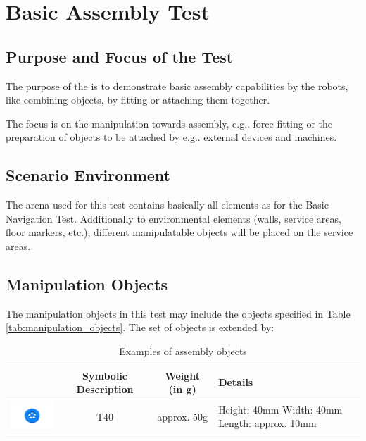 \newpage
\section{Basic Assembly Test}

\subsection{Purpose and Focus of the Test}
The purpose of the  is to demonstrate basic assembly capabilities by the robots, like combining objects, by fitting or attaching them together.
\par
The focus is on the manipulation towards assembly, e.g.. force fitting or the preparation of objects to be attached by e.g.. external devices and machines.

\subsection{Scenario Environment}
The arena used for this test contains basically all elements as for the Basic Navigation Test. Additionally to environmental elements (walls, service areas, floor markers, etc.), different manipulatable objects will be placed on the service areas. 

\subsection{Manipulation Objects}
The manipulation objects in this test may include the objects specified in Table \ref{tab:manipulation_objects}. The set of objects is extended by:

\begin{table}[p]
\begin{tabular}{|c|c|c|p{5cm}|}
\hline 
 & Symbolic Description & Weight (in g) & Details \\ 
\hline 
\includegraphics[width=3cm]{./images/BAT_Tire.png}  & T40 & approx. 50g & Height: 40mm \newline
 Width: 40mm \newline
 Length: approx. 10mm \\ 
\hline 
\end{tabular} 

\label{tab:bat_objects}
\caption{Examples of assembly objects}
\end{table}

